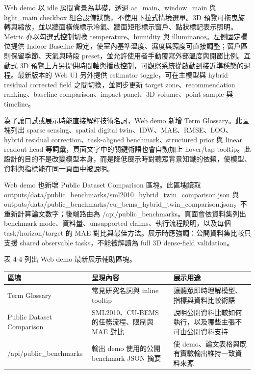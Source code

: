 \documentclass[12pt,a4paper]{article}
\begin{document}
Web demo 以 idle 房間背景為基礎，透過 ac\_\allowbreak{}main、window\_\allowbreak{}main 與 light\_\allowbreak{}main checkbox 組合設備狀態，不使用下拉式情境選單。3D 預覽可拖曳旋轉與縮放，並以牆面橫條標示冷氣、牆面矩形標示窗戶、點狀標記表示照明。Metric 亦以勾選式控制切換 temperature、humidity 與 illuminance。左側固定欄位提供 Indoor Baseline 設定，使室內基準溫度、濕度與照度可直接調整；窗戶區則保留季節、天氣與時段 preset，並允許使用者手動覆寫外部溫度與開窗比例。互動式 3D 預覽上方另提供時間軸與播放控制，可觀察系統從啟動到接近準穩態的過程。最新版本的 Web UI 另外提供 estimator toggle，可在主模型與 hybrid residual corrected field 之間切換，並同步更新 target zone、recommendation ranking、baseline comparison、impact panel、3D volume、point sample 與 timeline。


為了讓口試或展示時能直接解釋技術名詞，Web demo 新增 Term Glossary。此區塊列出 sparse sensing、spatial digital twin、IDW、MAE、RMSE、LOO、hybrid residual correction、task-aligned benchmark、structured prior 與 linear readout head 等詞彙，頁面文字中的關鍵術語也會自動加上 hover/tap tooltip。此設計的目的不是改變模型本身，而是降低展示時對聽眾背景知識的依賴，使模型、資料與指標能在同一頁面中被說明。


Web demo 也新增 Public Dataset Comparison 區塊。此區塊讀取 outputs/data/public\_\allowbreak{}benchmarks/sml2010\_\allowbreak{}hybrid\_\allowbreak{}twin\_\allowbreak{}comparison.json 與 outputs/data/public\_\allowbreak{}benchmarks/cu\_\allowbreak{}bems\_\allowbreak{}hybrid\_\allowbreak{}twin\_\allowbreak{}comparison.json，不重新計算論文數字；後端路由為 /api/public\_\allowbreak{}benchmarks。頁面會依資料集列出 benchmark mode、資料量、unsupported claims、執行流程說明，以及每個 task/horizon/target 的 MAE 對比與最佳方法。展示時應強調：公開資料集比較只支援 shared observable tasks，不能被解讀為 full 3D dense-field validation。


表 4-4 列出 Web demo 最新展示輔助區塊。


\begin{table}[htbp]
\centering
\footnotesize
\renewcommand{\arraystretch}{1.25}
\begin{tabular}{|>{\raggedright\arraybackslash}p{}|>{\raggedright\arraybackslash}p{}|>{\raggedright\arraybackslash}p{}|}
\hline
\textbf{區塊} & \textbf{呈現內容} & \textbf{展示用途} \\
\hline
Term Glossary & 常見研究名詞與 inline tooltip & 讓聽眾即時理解模型、指標與資料比較術語 \\
\hline
Public Dataset Comparison & SML2010、CU-BEMS 的任務流程、限制與 MAE 對比 & 說明公開資料比較如何執行，以及哪些主張不可由公開資料支持 \\
\hline
/api/public\_\allowbreak{}benchmarks & 輸出 demo 使用的公開 benchmark JSON 摘要 & 使 demo、論文表格與既有實驗輸出維持一致資料來源 \\
\hline
\end{tabular}
\end{table}
\end{document}
